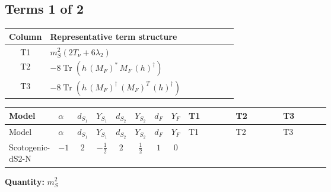 \documentclass[8pt]{article}
\begin{document}
\begin{landscape}
\subsection*{Terms 1 of 2}
\begin{center}
\begin{tabular}{@{}c >{\raggedright\arraybackslash}p{0.82\linewidth}@{}}
\toprule
Column & Representative term structure \\
\midrule
T1 & \(\displaystyle {m_S^2} (2 T_\nu+6 {\lambda_2})\) \\
\midrule
T2 & \(\displaystyle -8 \operatorname{Tr}\!\left({h}\,\left({M_F}\right)^{*}\,{M_F}\,\left({h}\right)^{\dagger}\right)\) \\
\midrule
T3 & \(\displaystyle -8 \operatorname{Tr}\!\left({h}\,\left({M_F}\right)^{\dagger}\,\left({M_F}\right)^{T}\,\left({h}\right)^{\dagger}\right)\) \\
\midrule
\bottomrule
\end{tabular}
\end{center}
\smallskip
\tiny
\begin{longtable}{@{}llcccccc >{\raggedright\arraybackslash}p{0.21\linewidth} >{\raggedright\arraybackslash}p{0.21\linewidth} >{\raggedright\arraybackslash}p{0.21\linewidth}@{}}
\toprule
Model & $\alpha$ & $d_{S_1}$ & $Y_{S_1}$ & $d_{S_2}$ & $Y_{S_2}$ & $d_F$ & $Y_F$ & T1 & T2 & T3 \\
\midrule
\endfirsthead
\toprule
Model & $\alpha$ & $d_{S_1}$ & $Y_{S_1}$ & $d_{S_2}$ & $Y_{S_2}$ & $d_F$ & $Y_F$ & T1 & T2 & T3 \\
\midrule
\endhead
Scotogenic-dS2-N & $-1$ & $2$ & $-\frac{1}{2}$ & $2$ & $\frac{1}{2}$ & $1$ & $0$ & \scriptsize\adjustbox{max width=\linewidth}{$\begin{gathered} {m_S^2} (2 T_\nu+6 {\lambda_2})\end{gathered}$} & \scriptsize\adjustbox{max width=\linewidth}{$\begin{gathered} -8 \operatorname{Tr}\!\left({h}\,\left({M_F}\right)^{*}\,{M_F}\,\left({h}\right)^{\dagger}\right)\end{gathered}$} & \scriptsize\adjustbox{max width=\linewidth}{$\begin{gathered} -8 \operatorname{Tr}\!\left({h}\,\left({M_F}\right)^{\dagger}\,\left({M_F}\right)^{T}\,\left({h}\right)^{\dagger}\right)\end{gathered}$} \\
\midrule
\bottomrule
\end{longtable}
\clearpage
\noindent\textbf{Quantity: }$m_S^2$\par\smallskip

\end{landscape}
\end{document}
